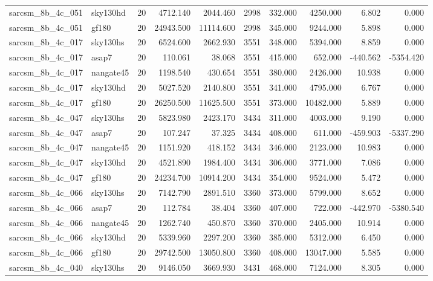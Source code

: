 \documentclass{article}
\begin{document}
\begin{longtable}{llrrrrrrrr}
sarcsm\_8b\_4c\_051 & sky130hd & 20 & 4712.140 & 2044.460 & 2998 & 332.000 & 4250.000 & 6.802 & 0.000 \\
sarcsm\_8b\_4c\_051 & gf180 & 20 & 24943.500 & 11114.600 & 2998 & 345.000 & 9244.000 & 5.898 & 0.000 \\
sarcsm\_8b\_4c\_017 & sky130hs & 20 & 6524.600 & 2662.930 & 3551 & 348.000 & 5394.000 & 8.859 & 0.000 \\
sarcsm\_8b\_4c\_017 & asap7 & 20 & 110.061 & 38.068 & 3551 & 415.000 & 652.000 & -440.562 & -5354.420 \\
sarcsm\_8b\_4c\_017 & nangate45 & 20 & 1198.540 & 430.654 & 3551 & 380.000 & 2426.000 & 10.938 & 0.000 \\
sarcsm\_8b\_4c\_017 & sky130hd & 20 & 5027.520 & 2140.800 & 3551 & 341.000 & 4795.000 & 6.767 & 0.000 \\
sarcsm\_8b\_4c\_017 & gf180 & 20 & 26250.500 & 11625.500 & 3551 & 373.000 & 10482.000 & 5.889 & 0.000 \\
sarcsm\_8b\_4c\_047 & sky130hs & 20 & 5823.980 & 2423.170 & 3434 & 311.000 & 4003.000 & 9.190 & 0.000 \\
sarcsm\_8b\_4c\_047 & asap7 & 20 & 107.247 & 37.325 & 3434 & 408.000 & 611.000 & -459.903 & -5337.290 \\
sarcsm\_8b\_4c\_047 & nangate45 & 20 & 1151.920 & 418.152 & 3434 & 346.000 & 2123.000 & 10.983 & 0.000 \\
sarcsm\_8b\_4c\_047 & sky130hd & 20 & 4521.890 & 1984.400 & 3434 & 306.000 & 3771.000 & 7.086 & 0.000 \\
sarcsm\_8b\_4c\_047 & gf180 & 20 & 24234.700 & 10914.200 & 3434 & 354.000 & 9524.000 & 5.472 & 0.000 \\
sarcsm\_8b\_4c\_066 & sky130hs & 20 & 7142.790 & 2891.510 & 3360 & 373.000 & 5799.000 & 8.652 & 0.000 \\
sarcsm\_8b\_4c\_066 & asap7 & 20 & 112.784 & 38.404 & 3360 & 407.000 & 722.000 & -442.970 & -5380.540 \\
sarcsm\_8b\_4c\_066 & nangate45 & 20 & 1262.740 & 450.870 & 3360 & 370.000 & 2405.000 & 10.914 & 0.000 \\
sarcsm\_8b\_4c\_066 & sky130hd & 20 & 5339.960 & 2297.200 & 3360 & 385.000 & 5312.000 & 6.450 & 0.000 \\
sarcsm\_8b\_4c\_066 & gf180 & 20 & 29742.500 & 13050.800 & 3360 & 408.000 & 13047.000 & 5.585 & 0.000 \\
sarcsm\_8b\_4c\_040 & sky130hs & 20 & 9146.050 & 3669.930 & 3431 & 468.000 & 7124.000 & 8.305 & 0.000 \\

\end{longtable}
\end{document}
